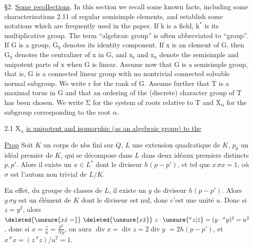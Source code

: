 \S2. \uline{Some recollections}. In this section we recall some known facts,
including some characterizations 2.11 of regular semisimple elements, and
establish some notations which are frequently used in the paper. If $\mathrm{k}$ is
a field, $\mathrm{k^*}$ is its multiplicative group. The term ``algebraic group'' is
often abbreviated to ``group''. If $\mathrm{G}$ is a group, $\mathrm{G_0}$ denotes its identity
component. If $\mathrm{x}$ is an element of $\mathrm{G}$, then $\mathrm{G_x}$ denotes the centralizer
of $\mathrm{x}$ in $\mathrm{G}$, and $\mathrm{x_s}$ and $\mathrm{x_u}$ denote the semisimple and unipotent parts
of $\mathrm{x}$ when $\mathrm{G}$ is linear. Assume now that $\mathrm{G}$ is a semisimple group, that
is, $\mathrm{G}$ is a connected linear group with no nontrivial connected solvable
normal subgroup. We write $\mathrm{r}$ for the rank of $\mathrm{G}$. Assume further that $\mathrm{T}$
is a maximal torus in $\mathrm{G}$ and that an ordering of the (discrete) character
group of $\mathrm{T}$ has been chosen. We write $\mathrm{\Sigma}$ for the system of roots relative
to $\mathrm{T}$ and $\mathrm{X_\alpha}$ for the subgroup corresponding to the root $\mathrm{\alpha}$.

2.1 $\mathrm{X_\alpha}$ \uline{is unipotent and isomorphic (as an algebraic group) to the}

\uline{Prop} Soit $K$ un corps de nbs fini sur $Q$,
$L$ une extension quadratique de $K$, $p_0$ un idéal
premier de $K$,  qui se décompose dans $L$ dans
deux idéaux premiers distincts $p,p'$. Alors il
existe un $x\in L^*$ 
 dont le diviseur  $h(p-p')$,  et tel que
 $x\,\sigma x=1$, où $\sigma$ est l'autom non trivial de $L/K$.

En effet,  du groupe de
classes  de $L$, il existe un $y$ de diviseur
$h(p-p')$. Alors $y\,\sigma y$ est un élément de $K$ dont le
diviseur est  nul, donc c'est une unité $u$.
Donc si $z=y^2$, alors $\deleted{\unsure{x\bar x=}}\ \deleted{\unsure{x\bar x}}\ z\cdot\unsure{{}^{\sigma}z|\bar z}=(y\cdot{}^\sigma y)^2=u^2$,
donc si $x=\frac zu=\frac{y^2}{Ny}$, on aura $\operatorname{div}x=\operatorname{div}z=2\operatorname{div}y$
$=2h(p-p')$, et $x\,{}^\sigma x=(z\,{}^\sigma z)/u^2=1$.

